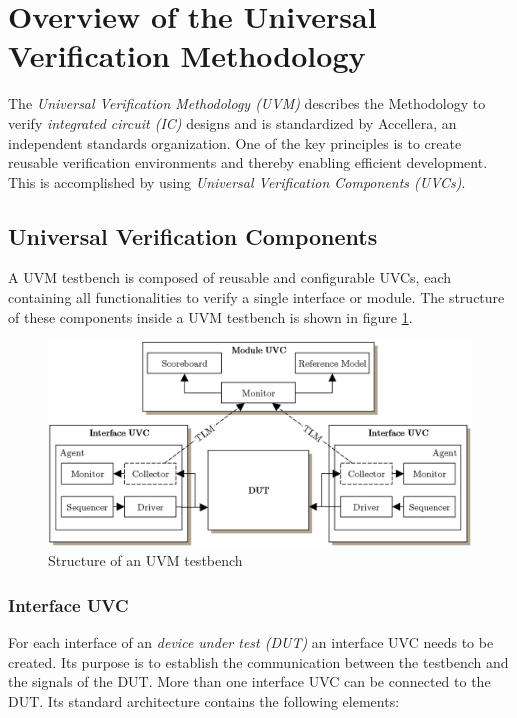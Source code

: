 \section{Overview of the Universal Verification Methodology}\label{uvm}

The \emph{Universal Verification Methodology (UVM)} describes the Methodology to
verify \emph{integrated circuit (IC)} designs and is standardized by Accellera,
an independent standards organization. One of the key principles is to create
reusable verification environments and thereby enabling efficient development.
This is accomplished by using \emph{Universal Verification Components (UVCs)}.

\subsection{Universal Verification Components}\label{uvc}

A UVM testbench is composed of reusable and configurable UVCs, each
containing all functionalities to verify a single interface or module. The
structure of these components inside a UVM testbench is shown in figure
\ref{fig:UVM_testbench}.

\begin{figure}[htb]
 \centering
 \includegraphics[scale=0.3]{abb/UVM_testbench}
 \caption{Structure of an UVM testbench}
\label{fig:UVM_testbench}
\end{figure}

\subsubsection{Interface UVC}\label{interface_uvc}

For each interface of an \emph{device under test (DUT)} an interface UVC needs
to be created. Its purpose is to establish the communication between
the testbench and the signals of the DUT. More than one interface UVC can be
connected to the DUT. Its standard architecture contains the following elements:

